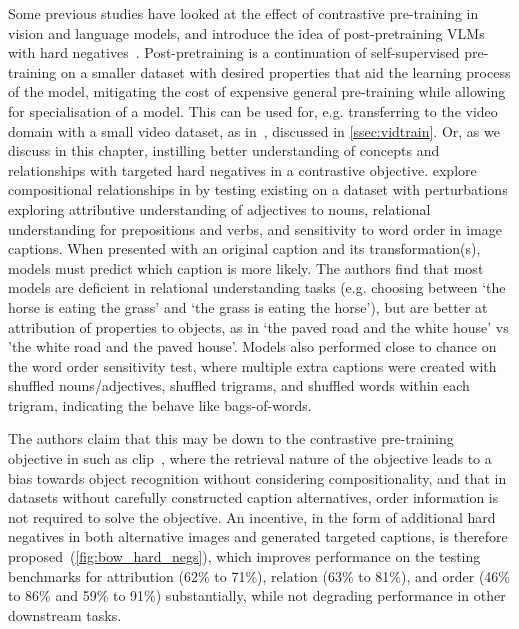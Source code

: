 Some previous studies have looked at the effect of contrastive pre-training in
vision and language models, and introduce the idea of post-pretraining VLMs
with hard negatives~\citep{yuksekgonul2023when, momeni2023verbs,
bagad2023testoftime}. Post-pretraining is a continuation of self-supervised
pre-training on a smaller dataset with desired properties that aid the learning
process of the model, mitigating the cost of expensive general pre-training
while allowing for specialisation of a model. This can be used for, e.g.
transferring  to the video domain with a small video dataset,
as in~\citet{luo2022clip4clip}, discussed in \cref{ssec:vidtrain}. Or, as we
discuss in this chapter, instilling better understanding of concepts and
relationships with targeted hard negatives in a contrastive objective.
\citet{yuksekgonul2023when} explore compositional relationships in
 by testing existing  on a dataset with
perturbations exploring attributive understanding of adjectives to nouns,
relational understanding for prepositions and verbs, and sensitivity to word
order in image captions. When presented with an original caption and its
transformation(s), models must predict which caption is more likely. The
authors find that most models are deficient in relational understanding tasks
(e.g. choosing between `the horse is eating the grass' and `the grass is eating
the horse'), but are better at attribution of properties to objects, as in `the
paved road and the white house' vs 'the white road and the paved house'. Models
also performed close to chance on the word order sensitivity test, where
multiple extra captions were created with shuffled nouns/adjectives, shuffled
trigrams, and shuffled words within each trigram, indicating the
 behave like bags-of-words.

The authors claim that this may be down to the contrastive pre-training
objective in  such as \acrshort{clip}~\citep{radford2021clip},
where the retrieval nature of the objective leads to a bias towards object
recognition without considering compositionality, and that in datasets without
carefully constructed caption alternatives, order information is not required
to solve the objective. An incentive, in the form of additional hard negatives
in both alternative images and generated targeted captions, is therefore
proposed~(\cref{fig:bow_hard_negs}), which improves performance on the testing
benchmarks for attribution (62\% to 71\%), relation (63\% to 81\%), and order
(46\% to 86\% and 59\% to 91\%) substantially, while not degrading performance
in other downstream tasks.


